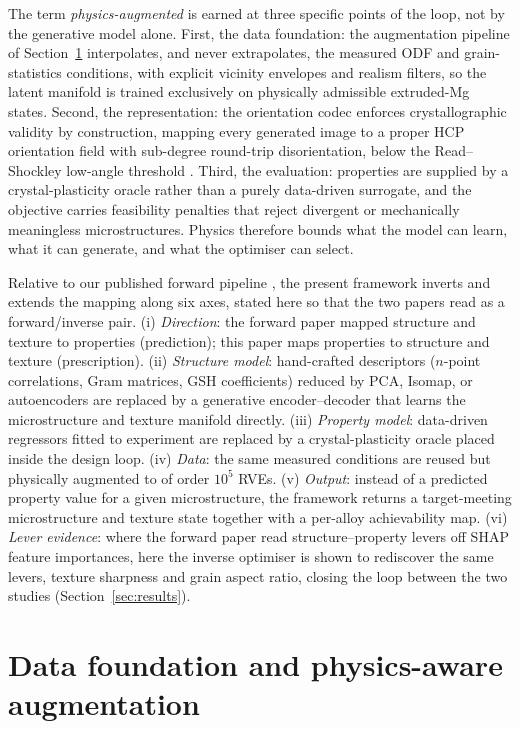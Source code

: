 \documentclass[preprint,12pt]{elsarticle}
\begin{document}
The term \emph{physics-augmented} is earned at three specific points of the loop, not by the generative model alone. First, the data foundation: the augmentation pipeline of Section~\ref{sec:augmentation} interpolates, and never extrapolates, the measured ODF and grain-statistics conditions, with explicit vicinity envelopes and realism filters, so the latent manifold is trained exclusively on physically admissible extruded-Mg states. Second, the representation: the orientation codec enforces crystallographic validity by construction, mapping every generated image to a proper HCP orientation field with sub-degree round-trip disorientation, below the Read--Shockley low-angle threshold \cite{readshockley1950}. Third, the evaluation: properties are supplied by a crystal-plasticity oracle rather than a purely data-driven surrogate, and the objective carries feasibility penalties that reject divergent or mechanically meaningless microstructures. Physics therefore bounds what the model can learn, what it can generate, and what the optimiser can select.

Relative to our published forward pipeline \cite{Guru2025}, the present framework inverts and extends the mapping along six axes, stated here so that the two papers read as a forward/inverse pair. (i) \emph{Direction}: the forward paper mapped structure and texture to properties (prediction); this paper maps properties to structure and texture (prescription). (ii) \emph{Structure model}: hand-crafted descriptors ($n$-point correlations, Gram matrices, GSH coefficients) reduced by PCA, Isomap, or autoencoders are replaced by a generative encoder--decoder that learns the microstructure and texture manifold directly. (iii) \emph{Property model}: data-driven regressors fitted to experiment are replaced by a crystal-plasticity oracle placed inside the design loop. (iv) \emph{Data}: the same measured conditions are reused but physically augmented to of order $10^{5}$ RVEs. (v) \emph{Output}: instead of a predicted property value for a given microstructure, the framework returns a target-meeting microstructure and texture state together with a per-alloy achievability map. (vi) \emph{Lever evidence}: where the forward paper read structure--property levers off SHAP feature importances, here the inverse optimiser is shown to rediscover the same levers, texture sharpness and grain aspect ratio, closing the loop between the two studies (Section~\ref{sec:results}).

\section{Data foundation and physics-aware augmentation}
\label{sec:augmentation}
\end{document}

